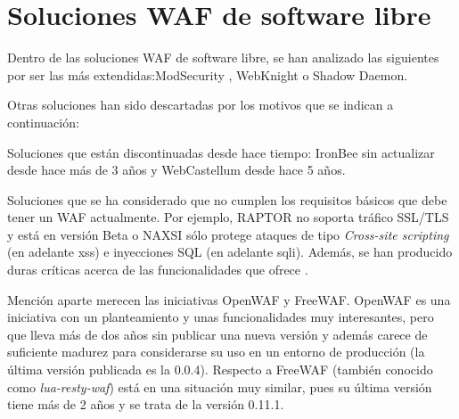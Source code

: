 \section{Soluciones WAF de software libre}
\par Dentro de las soluciones WAF de software libre, se han analizado las siguientes por ser las más extendidas:ModSecurity \cite{modsecurity},
WebKnight\cite{WebKnight} o Shadow Daemon\cite{ShadowDaemon}.
\par Otras soluciones han sido descartadas por los motivos que se indican a continuación:
\par Soluciones que están discontinuadas desde hace tiempo: IronBee\cite{IronBee} sin actualizar desde hace más de 3 años y
WebCastellum\cite{WebCastellum} desde hace 5 años.
\par Soluciones que se ha considerado que no cumplen los requisitos básicos que debe tener un WAF actualmente. Por ejemplo, RAPTOR\cite{raptor} no
soporta tráfico SSL/TLS y está en versión Beta o NAXSI\cite{NAXSI} sólo protege ataques de tipo {\em Cross-site scripting} (en adelante
\acrshort{xss}\cite{owaspxss}) e inyecciones SQL (en adelante \acrshort{sqli}\cite{owaspsqli}). Además, se han producido duras críticas acerca
de las funcionalidades que ofrece \cite{naxsianalisis}.
\par Mención aparte merecen las iniciativas OpenWAF\cite{openwaf} y FreeWAF\cite{freewaf}. OpenWAF es una iniciativa con un planteamiento y
unas funcionalidades muy interesantes, pero que lleva más de dos años sin publicar una nueva versión y además carece de suficiente madurez para
considerarse su uso en un entorno de producción (la última versión publicada es la 0.0.4). Respecto a FreeWAF (también conocido como {\em
lua-resty-waf}) está en una situación muy similar, pues su última versión tiene más de 2 años y se trata de la versión
0.11.1\cite{freewafchangelog}.

